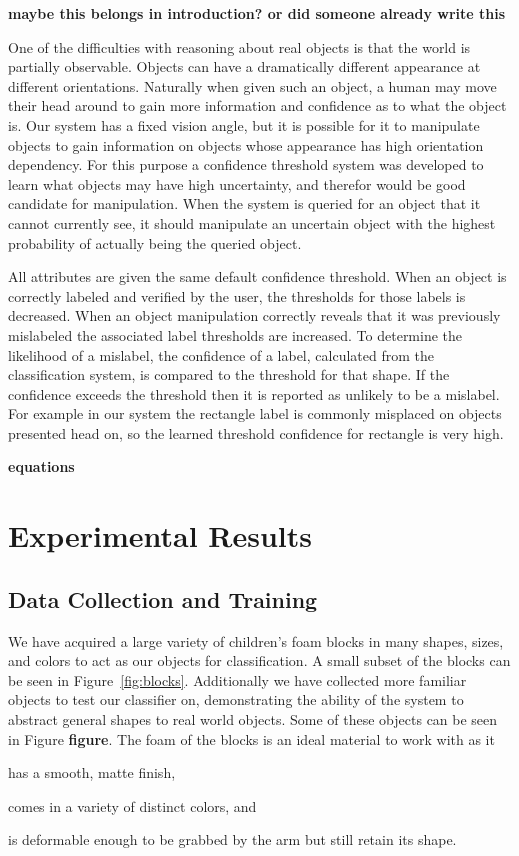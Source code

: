 \documentclass[11pt]{article}
\newcommand{\xxx}[1]{{\bf \color{red} #1}}
\newcommand{\meh}[1]{{\bf \color{blue} #1}}
\begin{document}
\meh{maybe this belongs in introduction? or did someone already write this}

One of the difficulties with reasoning about real objects is that the world is 
partially observable. Objects can have a dramatically different appearance at 
different orientations.  Naturally when given such an object, a human may move 
their head around to gain more information and confidence as to what the object is.  Our system has a fixed vision angle, but it is possible for it to 
manipulate objects to gain information on objects whose appearance has high 
orientation dependency.  For this purpose a confidence threshold system was 
developed to learn what objects may have high uncertainty, and therefor would 
be good candidate for manipulation.  When the system is queried for an object 
that it cannot currently see, it should manipulate an uncertain object with the 
highest probability of actually being the queried object.

All attributes are given the same default confidence threshold.  When an object 
is correctly labeled and verified by the user, the thresholds for those labels 
is decreased.  When an object manipulation correctly reveals that it was 
previously mislabeled the associated label thresholds are increased.  To 
determine the likelihood of a mislabel, the confidence of a label, calculated 
from the classification system, is compared to the threshold for that shape.  
If the confidence exceeds the threshold then it is reported as unlikely to be a 
mislabel.  For example in our system the rectangle label is commonly misplaced 
on objects presented head on, so the learned threshold confidence for rectangle 
is very high.

\xxx{equations}
\section{Experimental Results}

\subsection{Data Collection and Training}
We have acquired a large variety of children's foam blocks in many shapes, sizes,
and colors to act as our objects for classification. A small subset of the
blocks can be seen in Figure~\ref{fig:blocks}. Additionally we have collected 
more familiar objects to test our classifier on, demonstrating the ability of 
the system to abstract general shapes to real world objects. Some of these 
objects can be seen in Figure \meh{figure}. The foam of the blocks is an
ideal material to work with as it
\begin{inparaenum}[(1)]
\item has a smooth, matte finish,
\item comes in a variety of distinct colors, and
\item is deformable enough to be grabbed by the arm but still retain its
shape.
\end{inparaenum}
\end{document}
